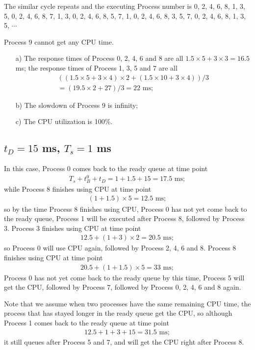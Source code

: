 \documentclass[12pt,letterpaper]{article}
\begin{document}
The similar cycle repeats and the executing Process number is 0, 2, 4, 6, 8, 1, 3, 5, 0, 2, 4, 6, 8, 7, 1, 3, 0, 2, 4, 6, 8, 5, 7, 1, 0, 2, 4, 6, 8, 3, 5, 7, 0, 2, 4, 6, 8, 1, 3, 5, $\cdots$

Process 9 cannot get any CPU time.

\begin{enumerate}
\item[a)] The response times of Process 0, 2, 4, 6 and 8 are all $1.5\times5+3\times3=16.5$ ms; the response times of Process 1, 3, 5 and 7 are all 
\begin{eqnarray}
((1.5\times5+3\times4)\times2+(1.5\times10+3\times4))/3\nonumber\\
=(19.5\times2+27)/3=22\textrm{ ms};
\end{eqnarray}
\item[b)] The slowdown of Process 9 is infinity;
\item[c)] The CPU utilization is 100\%.
\end{enumerate}

\subsection{$t_D=15$ ms, $T_s = 1$ ms}
In this case, Process 0 comes back to the ready queue at time point
\begin{eqnarray}
T_s+t_B^0+t_D=1+1.5+15=17.5\textrm{ ms};
\end{eqnarray}
while Process 8 finishes using CPU at time point 
\begin{eqnarray}
(1+1.5)\times5=12.5\textrm{ ms};
\end{eqnarray}
so by the time Process 8 finishes using CPU, Process 0 has not yet come back to the ready queue, Process 1 will be executed after Process 8, followed by Process 3. Process 3 finishes using CPU at time point
\begin{eqnarray}
12.5+(1+3)\times2=20.5\textrm{ ms};
\end{eqnarray}
so Process 0 will use CPU again, followed by Process 2, 4, 6 and 8. Process 8 finishes using CPU at time point
\begin{eqnarray}
20.5+(1+1.5)\times5=33\textrm{ ms};
\end{eqnarray}
Process 0 has not yet come back to the ready queue by this time, Process 5 will get the CPU, followed by Process 7, followed by Process 0, 2, 4, 6 and 8 again.

Note that we assume when two processes have the same remaining CPU time, the process that has stayed longer in the ready queue get the CPU, so although Process 1 comes back to the ready queue at time point
\begin{eqnarray}
12.5+1+3+15=31.5\textrm{ ms};
\end{eqnarray}
it still queues after Process 5 and 7, and will get the CPU right after Process 8.
\end{document}
